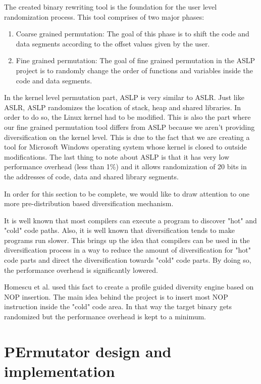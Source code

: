\documentclass[11pt,final,conference,a4paper]{IEEEtran}
\begin{document}
The created binary rewriting tool is the foundation for the user level randomization process. This tool comprises of two major phases:
\begin{enumerate}
\item Coarse grained permutation: The goal of this phase is to shift the code and data segments according to the offset values given by the user.
\item Fine grained permutation: The goal of fine grained permutation in the ASLP project is to randomly change the order of functions and variables inside the code and data segments.
\end{enumerate}
In the kernel level permutation part, ASLP is very similar to ASLR. Just like ASLR, ASLP randomizes the location of stack, heap and shared libraries. In order to do so, the Linux kernel had to be modified. This is also the part where our fine grained permutation tool differs from ASLP because we aren't providing diversification on the kernel level. This is due to the fact that we are creating a tool for Microsoft Windows operating system whose kernel is closed to outside modifications.
The last thing to note about ASLP is that it has very low performance overhead (less than 1\%) and it allows randomization of 20 bits in the addresses of code, data and shared library segments.

In order for this section to be complete, we would like to draw attention to one more pre-distribution based diversification mechanism. 

It is well known that most compilers can execute a program to discover "hot" and "cold" code paths. Also, it is well known that diversification tends to make programs run slower. This brings up the idea that compilers can be used in the diversification process in a way to reduce the amount of diversification for "hot" code parts and direct the diversification towards "cold" code parts. By doing so, the performance overhead is significantly lowered.

Homescu et al. used this fact to create a profile guided diversity engine based on NOP insertion. The main idea behind the project is to insert most NOP instruction inside the "cold" code area. In that way the target binary gets randomized but the performance overhead is kept to a minimum. 


\section{PErmutator design and implementation}
\label{sec:design}
\end{document}
